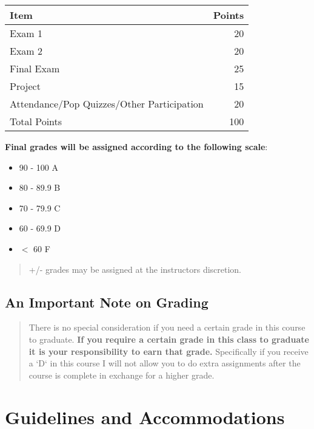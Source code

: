 \documentclass[11pt]{article}
\begin{document}
\begin{center}


\begin{center}
\begin{tabular}{lr}
Item & Points\\
\hline
Exam 1 & 20\\
Exam 2 & 20\\
Final Exam & 25\\
Project & 15\\
Attendance/Pop Quizzes/Other Participation & 20\\
\hline
Total Points & 100\\
\hline
\end{tabular}
\end{center}
\end{center}

\begin{center}
\textbf{\textbf{Final grades will be assigned according to the following scale}}:
\end{center}

\begin{itemize}
\item 90 - 100 A
\item 80 - 89.9 B
\item 70 - 79.9 C
\item 60 - 69.9 D
\item \(<\) 60 F
\end{itemize}

\begin{quote}
+/- grades may be assigned at the instructors discretion.
\end{quote}

\subsection{An Important Note on Grading}
\label{sec:org1ec0cfc}

\begin{quote}
There is no special consideration if you need a certain grade in this course to graduate.  \textbf{\textbf{If you require a certain grade in this class to graduate it is your responsibility to earn that grade.}} Specifically if you receive a `D` in this course I will not allow you to do extra assignments after the course is complete in exchange for a higher grade. 
\end{quote}


\section{Guidelines and Accommodations}
\label{sec:org9a5160b}
\end{document}
